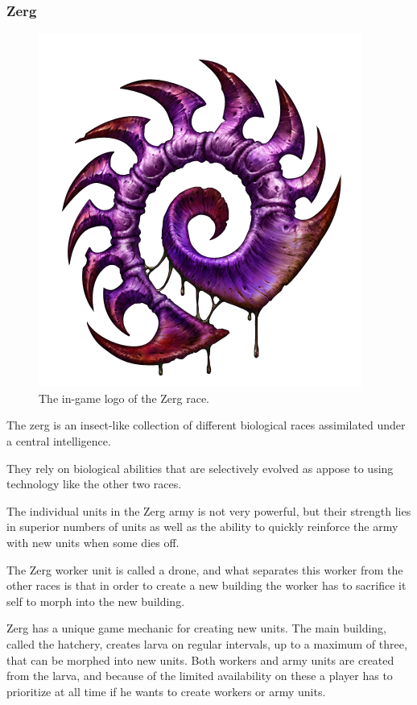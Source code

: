 \subsubsection{Zerg}
\begin{figure}[h!tb]
\centering
\includegraphics[scale=0.3]{graphics/zergicon.png}
\caption{The in-game logo of the Zerg race.\cite{zerglogo}}
\end{figure}

The zerg is an insect-like collection of different biological races assimilated under a central intelligence.

They rely on biological abilities that are selectively evolved as appose to using technology like the other two races.

The individual units in the Zerg army is not very powerful, but their strength lies in superior numbers of units as well as the ability to quickly reinforce the army with new units when some dies off.

The Zerg worker unit is called a drone, and what separates this worker from the other races is that in order to create a new building the worker has to sacrifice it self to morph into the new building.

Zerg has a unique game mechanic for creating new units. The main building, called the hatchery, creates larva on regular intervals, up to a maximum of three, that can be morphed into new units. Both workers and army units are created from the larva, and because of the limited availability on these a player has to prioritize at all time if he wants to create workers or army units.

